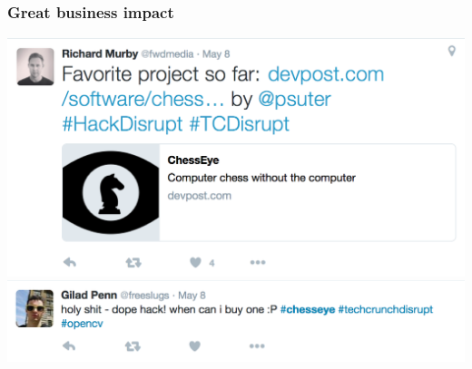 \documentclass[t]{beamer}
\begin{document}

\begin{frame}[fragile]
\frametitle{Great business impact}

\begin{center}
  \includegraphics[scale=0.5]{figures/tweet1}\\
  \includegraphics[scale=0.5]{figures/tweet2}
\end{center}

\end{frame}




\end{document}
